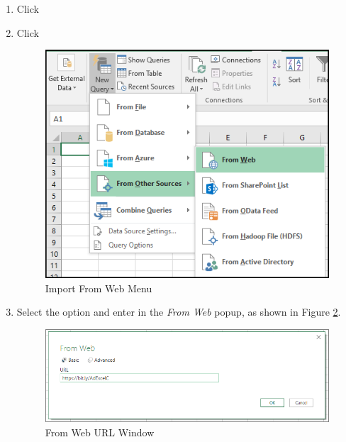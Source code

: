 \begin{enumbox}
	\begin{enumerate}
		\item {} Click 
		\item {} Click 
	
		\begin{figure}[H]
			\centering
			\includegraphics[width=\maxwidth{.75\linewidth}]{gfx/ch07_fig01}
			\caption{Import From Web Menu}
			\label{07:fig01}
		\end{figure}
	
		\item Select the  option and enter  in the \textit{From Web} popup, as shown in Figure \ref{07:fig02a}.
	
		\begin{figure}[H]
			\centering
			\includegraphics[width=\maxwidth{.95\linewidth}]{gfx/ch07_fig02a}
			\caption{From Web URL Window}
			\label{07:fig02a}
		\end{figure}
	

\end{enumerate}
\end{enumbox}
